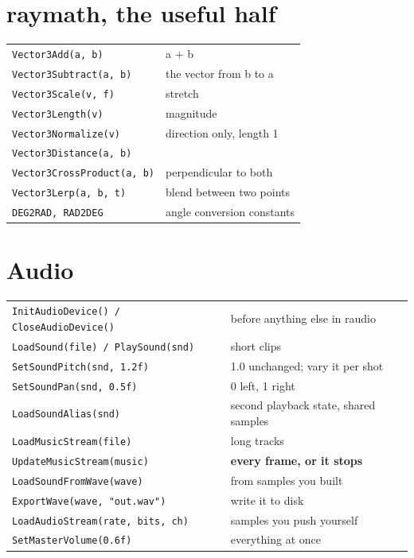 \section{raymath, the useful half}

\begin{center}
\begin{tabular}{@{}ll@{}}
\toprule
\lstinline|Vector3Add(a, b)| & a + b \\
\lstinline|Vector3Subtract(a, b)| & the vector from b to a \\
\lstinline|Vector3Scale(v, f)| & stretch \\
\lstinline|Vector3Length(v)| & magnitude \\
\lstinline|Vector3Normalize(v)| & direction only, length 1 \\
\lstinline|Vector3Distance(a, b)| & \\
\lstinline|Vector3CrossProduct(a, b)| & perpendicular to both \\
\lstinline|Vector3Lerp(a, b, t)| & blend between two points \\
\lstinline|DEG2RAD, RAD2DEG| & angle conversion constants \\
\bottomrule
\end{tabular}
\end{center}

\section{Audio}

\begin{center}
\begin{tabular}{@{}ll@{}}
\toprule
\lstinline|InitAudioDevice() / CloseAudioDevice()| & before anything else in raudio \\
\lstinline|LoadSound(file) / PlaySound(snd)| & short clips \\
\lstinline|SetSoundPitch(snd, 1.2f)| & 1.0 unchanged; vary it per shot \\
\lstinline|SetSoundPan(snd, 0.5f)| & 0 left, 1 right \\
\lstinline|LoadSoundAlias(snd)| & second playback state, shared samples \\
\lstinline|LoadMusicStream(file)| & long tracks \\
\lstinline|UpdateMusicStream(music)| & \textbf{every frame, or it stops} \\
\lstinline|LoadSoundFromWave(wave)| & from samples you built \\
\lstinline|ExportWave(wave, "out.wav")| & write it to disk \\
\lstinline|LoadAudioStream(rate, bits, ch)| & samples you push yourself \\
\lstinline|SetMasterVolume(0.6f)| & everything at once \\
\bottomrule
\end{tabular}
\end{center}


